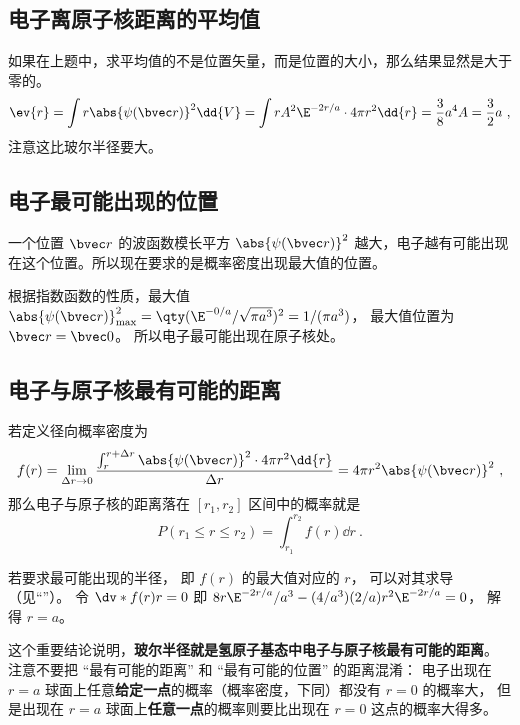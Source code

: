 \subsection{电子离原子核距离的平均值}

如果在上题中，求平均值的不是位置矢量，而是位置的大小，那么结果显然是大于零的。
\begin{equation}
\ev{r} = \int r \abs{\psi (\bvec r)}^2 \dd{V} = \int r A^2 \E^{-2r/a} \cdot 4\pi r^2 \dd{r} = \frac{3}{8} a^4 A = \frac{3}{2}a~,
\end{equation}
注意这比玻尔半径要大。

\subsection{电子最可能出现的位置}

一个位置 $\bvec r$ 的波函数模长平方 $\abs{\psi(\bvec r)}^2$ 越大，电子越有可能出现在这个位置。所以现在要求的是概率密度出现最大值的位置。
 
根据指数函数的性质，最大值 $\abs{\psi (\bvec r)}_{\max}^2 = \qty( \E^{-0/a}/\sqrt{\pi a^3})^2 = 1/(\pi a^3)$， 最大值位置为 $\bvec r = \bvec 0$。 所以电子最可能出现在原子核处。

\subsection{电子与原子核最有可能的距离}
若定义径向概率密度为
\begin{equation}\label{eq_HWF0_1}
f(r) = \lim_{\Delta r \to 0} \frac{\int_r^{r + \Delta r} {\abs{\psi (\bvec r)}}^2 \cdot 4\pi r^2 \dd{r} }{\Delta r} = 4\pi r^2 \abs{\psi(\bvec r)}^2~,
\end{equation}
那么电子与原子核的距离落在 $[r_1, r_2]$ 区间中的概率就是
\begin{equation}
P(r_1 \le r \le r_2) = \int_{r_1}^{r_2} f(r) \dd{r}~.
\end{equation}

若要求最可能出现的半径， 即 $f(r)$ 的最大值对应的 $r$， 可以对其求导（见“”）。 令 $\dv*{f(r)}{r} = 0$ 即 $8 r \E^{-2r/a}/a^3 - (4/a^3)(2/a)r^2 \E^{-2r/a} = 0$， 解得 $r = a$。 
 
这个重要结论说明，\textbf{玻尔半径就是氢原子基态中电子与原子核最有可能的距离}。 注意不要把 “最有可能的距离” 和 “最有可能的位置” 的距离混淆： 电子出现在 $r = a$ 球面上任意\textbf{给定一点}的概率（概率密度，下同）都没有 $r = 0$ 的概率大， 但是出现在 $r = a$ 球面上\textbf{任意一点}的概率则要比出现在 $r = 0$ 这点的概率大得多。
